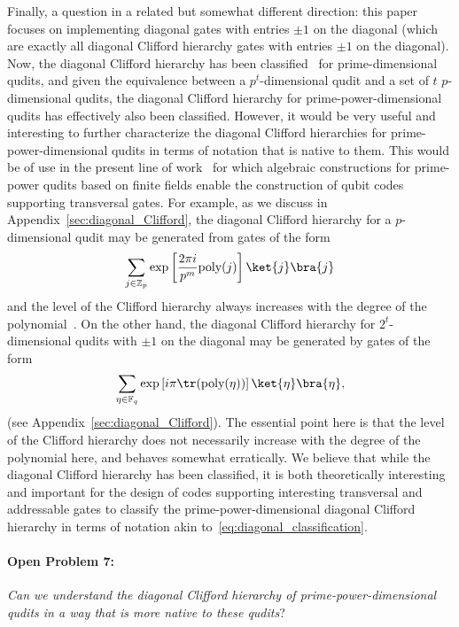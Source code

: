 \documentclass[11pt]{article}
\theoremstyle{definition}
\begin{document}
    Finally, a question in a related but somewhat different direction: this paper focuses on implementing diagonal gates with entries $\pm 1$ on the diagonal (which are exactly all diagonal Clifford hierarchy gates with entries $\pm 1$ on the diagonal).
    Now, the diagonal Clifford hierarchy has been classified~\cite{cui2017diagonal} for prime-dimensional qudits, and given the equivalence between a $p^t$-dimensional qudit and a set of $t$ $p$-dimensional qudits, the diagonal Clifford hierarchy for prime-power-dimensional qudits has effectively also been classified. However, it would be very useful and interesting to further characterize the diagonal Clifford hierarchies for prime-power-dimensional qudits in terms of notation that is native to them. This would be of use in the present line of work~\cite{wills2024constant,golowich2024asymptoticallygoodquantumcodes,nguyen2024goodbinaryquantumcodes,golowich2024quantum} for which algebraic constructions for prime-power qudits based on finite fields enable the construction of qubit codes supporting transversal gates. For example, as we discuss in Appendix~\ref{sec:diagonal_Clifford}, the diagonal Clifford hierarchy for a $p$-dimensional qudit may be generated from gates of the form
    \begin{equation}
        \sum_{j \in \mathbb{Z}_p}\exp\left[\frac{2\pi i}{p^m}\text{poly}(j)\right]\ket{j}\bra{j}
    \end{equation}
    and the level of the Clifford hierarchy always increases with the degree of the polynomial~\cite{cui2017diagonal}. On the other hand, the diagonal Clifford hierarchy for $2^t$-dimensional qudits with $\pm 1$ on the diagonal may be generated by gates of the form
    \begin{equation}\label{eq:diagonal_classification}
        \sum_{\eta \in \mathbb{F}_q}\exp\left[i\pi\tr(\text{poly}(\eta))\right]\ket{\eta}\bra{\eta},
    \end{equation}
    (see Appendix~\ref{sec:diagonal_Clifford}). The essential point here is that the level of the Clifford hierarchy does not necessarily increase with the degree of the polynomial here, and behaves somewhat erratically. We believe that while the diagonal Clifford hierarchy has been classified, it is both theoretically interesting and important for the design of codes supporting interesting transversal and addressable gates to classify the prime-power-dimensional diagonal Clifford hierarchy in terms of notation akin to~\eqref{eq:diagonal_classification}.
    
    \paragraph{Open Problem 7:} {\em Can we understand the diagonal Clifford hierarchy of prime-power-dimensional qudits in a way that is more native to these qudits}?
\end{document}

